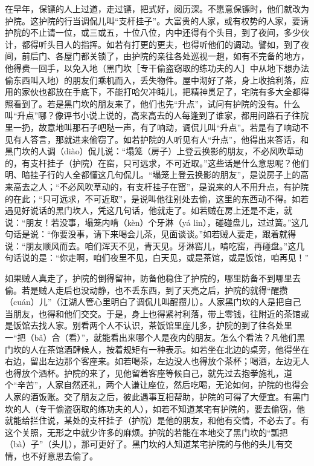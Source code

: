 \documentclass[12pt,UTF8]{ctexbook}
\begin{document}
在早年，保镖的人上过道，走过镖，把式好，阅历深。不愿意保镖时，他们就改为护院。这护院的行当调侃儿叫“支杆挂子”。大富贵的人家，或有权势的人家，要请护院的不止请一位，或三或五，十位八位，内中还得有个头目，到了夜间，多少伙计，都得听头目人的指挥。如若有打更的更夫，也得听他们的调动。譬如，到了夜间，前后门、各屋门都关锁了，由护院的亲往各处巡视一趟，如有不完备的地方，他得费一回手，以免入地（黑门坎［专干偷盗窃取的练功夫的人］中从地下想办法偷东西叫入地）的朋友们乘机而入，丢失物件。屋中沏好了茶，身上收拾利落，应用的家伙也都放在手底下，不能打哈欠冲盹儿，把精神贯足了，宅院有多大全都得照看到了。若是黑门坎的朋友来了，他们也先“升点”，试问有护院的没有。什么叫“升点”哪？像评书小说上说的，高来高去的人每逢到了谁家，都用问路石子往院里一扔，故意地叫那石子吧哒一声，有了响动，调侃儿叫“升点”。若是有了响动不见有人答言，那就进来偷窃了。如若护院的人听见有人“升点”，他得出来答话，和黑门坎的人调（diào）侃儿说：“塌笼（房子）上登云换影的朋友，不必风吹草动的，有支杆挂子（护院）在窑，只可远求，不可近取。”这些话是什么意思呢？他们明、暗挂子行的人全都懂这几句侃儿。“塌笼上登云换影的朋友”，是说房子上的高来高去之人；“不必风吹草动的，有支杆挂子在窑”，是说来的人不用升点，有护院的在此；“只可远求，不可近取”，是说叫他往别处去偷，这里的东西动不得。如若遇见好说话的黑门坎人，凭这几句话，他就走了。如若贼在房上还是不走，就说：“朋友！若没事，塌笼内啃（kèn）个牙淋（yá lin），碰碰盘儿，过过簧。”这几句话是说：“你要没事，请下来喝会儿茶，见面谈谈。”如若贼人要走，跟着就得说：“朋友顺风而去。咱们浑天不见，青天见。牙淋窑儿，啃吃窑，再碰盘。”这几句话说的是：“你走啊，咱们夜里不见，白天见，或是茶馆，或是饭馆，咱再见！”

如果贼人真走了，护院的倒得留神，防备他稳住了护院的，哪里防备不到哪里去偷。若是贼人走后也没动静，也不丢东西，到了天亮之后，护院的就得“醒攒（cuán）儿”（江湖人管心里明白了调侃儿叫醒攒儿）。人家黑门坎的人是把自己当朋友，也得和他们交交。于是，身上也得紧衬利落，带上零钱，往附近的茶馆或是饭馆去找人家。别看两个人不认识，茶饭馆里座儿多，护院的到了往各处里一“把（bǎ）合（看）”，就能看出来哪个人是夜内的朋友。怎么个看法？凡他们黑门坎的人在茶馆酒肆候人，按着规矩有一种表示。如若坐在北边的桌旁，他得坐在右边，留出左边那个客座来。如若喝茶，左边没人也得放个茶杯；喝酒，左边无人也得放个酒杯。护院的来了，见他留着客座等候自己，就先过去抱拳施礼，道个“辛苦”，人家自然还礼，两个人谦让座位，然后吃喝，无论如何，护院的也得会人家的酒饭账。交了朋友之后，彼此遇事互相帮助，护院的可得了大便宜。有黑门坎的人（专干偷盗窃取的练功夫的人），如若不知道某宅有护院的，要去偷窃，他就能给拦住说，某处的支杆挂子（护院）是他的朋友，和他有交情，不必去了。有这个关照，无形之中就少许多的麻烦。护院的若能在本地交了黑门坎的“瓢把（bà）子”（头儿），那可更好了。黑门坎的人知道某宅护院的与他的头儿有交情，也不好意思去偷了。
\end{document}

